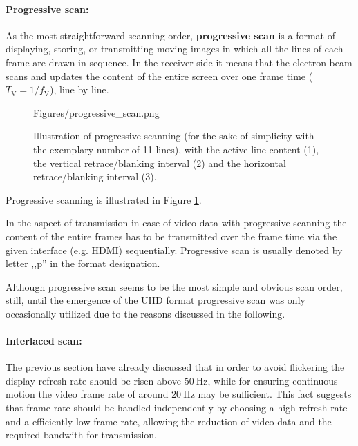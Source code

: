 \paragraph{Progressive scan:}
As the most straightforward scanning order, \textbf{progressive scan} is a format of displaying, storing, or transmitting moving images in which all the lines of each frame are drawn in sequence.
In the receiver side it means that the electron beam scans and updates the content of the entire screen over one frame time ($T_{\mathrm{V}} = 1/f_{\mathrm{V}}$), line by line.
\begin{figure}[]
	\centering
	\begin{minipage}[c]{0.6\textwidth}
	\begin{overpic}[width = 1\columnwidth ]{Figures/progressive_scan.png}
	\end{overpic}   \end{minipage}\hfill
		\begin{minipage}[c]{0.3\textwidth}
	\caption{Illustration of progressive scanning (for the sake of simplicity with the exemplary number of 11 lines), with the active line content (1), the vertical retrace/blanking interval (2) and the horizontal retrace/blanking interval (3).}
	\label{Fig:progressive}  \end{minipage}
\end{figure}
Progressive scanning is illustrated in Figure \ref{Fig:progressive}.

In the aspect of transmission in case of video data with progressive scanning the content of the entire frames has to be transmitted over the frame time via the given interface (e.g. HDMI) sequentially.
Progressive scan is usually denoted by letter ,,p'' in the format designation.

Although progressive scan seems to be the most simple and obvious scan order, still, until the emergence of the UHD format progressive scan was only occasionally utilized due to the reasons discussed in the following.

\vspace{3mm}
\paragraph{Interlaced scan:}
The previous section have already discussed that in order to avoid flickering the display refresh rate should be risen above $50~\mathrm{Hz}$, while for ensuring continuous motion the video frame rate of around $20~\mathrm{Hz}$ may be sufficient.
This fact suggests that frame rate should be handled independently by choosing a high refresh rate and a efficiently low frame rate, allowing the reduction of video data and the required bandwith for transmission.

